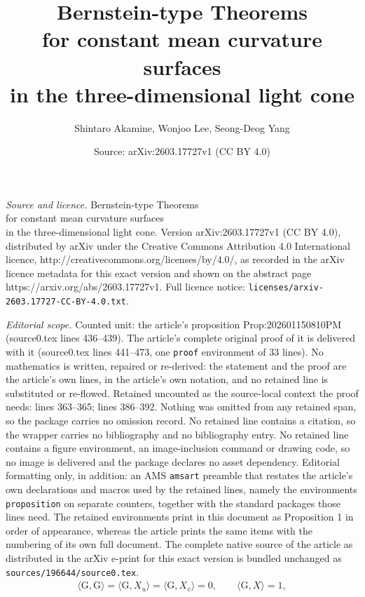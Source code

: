 \documentclass[10pt,a4paper]{amsart}
\title{Bernstein-type Theorems \\ for constant mean curvature surfaces \\ in the three-dimensional light cone}
\author{Shintaro Akamine, Wonjoo Lee, Seong-Deog Yang}
\date{Source: arXiv:2603.17727v1 (CC BY 4.0)}
\newcommand{\G}{\mathrm{G}}
\begin{document}
\maketitle

\noindent\emph{Source and licence.} Bernstein-type Theorems \\ for constant mean curvature surfaces \\ in the three-dimensional light cone. Version arXiv:2603.17727v1 (CC BY 4.0), distributed by arXiv under the Creative Commons Attribution 4.0 International licence, http://creativecommons.org/licenses/by/4.0/, as recorded in the arXiv licence metadata for this exact version and shown on the abstract page https://arxiv.org/abs/2603.17727v1. Full licence notice: \texttt{licenses/arxiv-2603.17727-CC-BY-4.0.txt}.\par\smallskip

\noindent\textit{Editorial scope.} Counted unit: the article's proposition Prop:202601150810PM (source0.tex lines 436--439). The article's complete original proof of it is delivered with it (source0.tex lines 441--473, one \texttt{proof} environment of 33 lines). No mathematics is written, repaired or re-derived: the statement and the proof are the article's own lines, in the article's own notation, and no retained line is substituted or re-flowed.  Retained uncounted as the source-local context the proof needs: lines 363--365; lines 386--392.  Nothing was omitted from any retained span, so the package carries no omission record.  No retained line contains a citation, so the wrapper carries no bibliography and no bibliography entry.  No retained line contains a figure environment, an image-inclusion command or drawing code, so no image is delivered and the package declares no asset dependency.  Editorial formatting only, in addition: an AMS \texttt{amsart} preamble that restates the article's own declarations and macros used by the retained lines, namely the environments \texttt{proposition} on separate counters, together with the standard packages those lines need.  The retained environments print in this document as Proposition 1 in order of appearance, whereas the article prints the same items with the numbering of its own full document.  The complete native source of the article as distributed in the arXiv e-print for this exact version is bundled unchanged as \texttt{sources/196644/source0.tex}.
\begin{align}\label{Eq:202507142137}
	\langle \G, \G \rangle = \langle \G, X_u \rangle = \langle \G, X_v \rangle = 0,\qquad \langle \G, X \rangle = 1,
\end{align}
\end{document}
